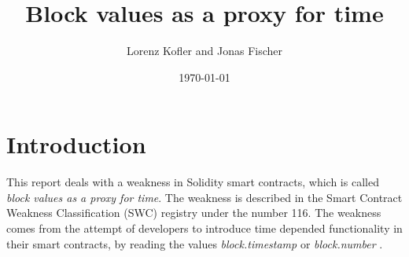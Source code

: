\documentclass{article}
\title{Block values as a proxy for time}
\author{Lorenz Kofler and Jonas Fischer}
\date{\today}
\begin{document}
\maketitle
\tableofcontents
\newpage

\section{Introduction}
This report deals with a weakness in Solidity smart contracts, which is called
\textit{block values as a proxy for time}. The weakness is described in the Smart
Contract Weakness Classification (SWC) registry under the number 116. The
weakness comes from the attempt of developers to introduce time depended
functionality in their smart contracts, by reading the values \textit{block.timestamp}
or \textit{block.number} \cite{swc116}. \newline


\newpage

% 




\newpage

\end{document}
